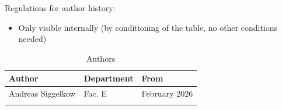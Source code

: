 Regulations for author history:
\begin{itemize}
  \item Only visible internally (by conditioning of the table, no other conditions needed)
\end{itemize}

\begin{table}[H]
\caption{Authors}
\label{tab:gpioauth01a}
\centering
\begin{tabularx}{\textwidth}{|X |X |X |}
  \hline
  Author & Department & From \\
  \hline
  \hline
  Andreas Siggelkow & Fac. E & February 2026 \\
  \hline
  && \\
  \hline
\end{tabularx}
\end{table}
